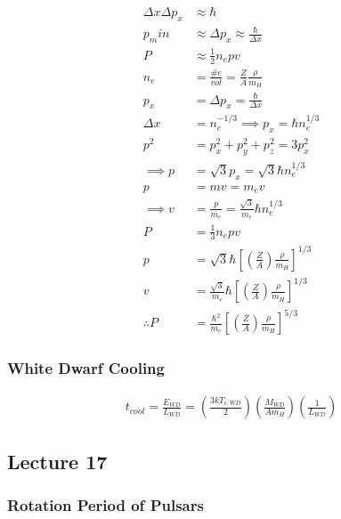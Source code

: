 \documentclass[a4paper,11pt,normalem]{article}
\begin{document}
\[
    \begin{aligned}
    \Delta x\Delta p_x &\approx \hbar \\
    p_min &\approx \Delta p_x \approx \frac{\hbar}{\Delta x} \\
    P &\approx \frac{1}{2}n_e pv \\
    n_e &= \frac{\# e}{vol} = \frac{Z}{A} \frac{\rho}{m_H} \\
    p_x &= \Delta p_x = \frac{\hbar}{\Delta x} \\
    \Delta x &= n_e^{-1/3} \implies p_x = \hbar n_e^{1/3} \\
    p^2 &= p_x^2 + p_y^2 + p_z^2 = 3p_x^2 \\
    \implies p &= \sqrt{3}p_x = \sqrt{3}\hbar n_e^{1/3} \\
    p &= mv = m_e v \\
    \implies v &= \frac{p}{m_e} = \frac{\sqrt{3}}{m_e}\hbar n_e^{1/3} \\
    P &= \frac{1}{3}n_e pv \\
    p &= \sqrt{3}\hbar \left[\left(\frac{Z}{A}\right)\frac{\rho}{m_H}\right]^{1/3} \\
    v &= \frac{\sqrt{3}}{m_e}\hbar \left[\left(\frac{Z}{A}\right) \frac{\rho}{m_H}\right]^{1/3} \\
    \therefore P &= \frac{\hbar^2}{m_e}\left[\left(\frac{Z}{A}\right) \frac{\rho}{m_H}\right]^{5/3}
    \end{aligned}
\]

\subsubsection{White Dwarf Cooling}\label{white-dwarf-cooling}

\[
    \begin{aligned}
    t_{cool} = \frac{E_{WD}}{L_{WD}} = \left(\frac{3kT_{c,WD}}{2}\right) \left(\frac{M_{WD}}{Am_H}\right) \left(\frac{1}{L_{WD}}\right)
    \end{aligned}
\]

\subsection{Lecture 17}\label{lecture-17}

\subsubsection{Rotation Period of
Pulsars}\label{rotation-period-of-pulsars}
\end{document}
